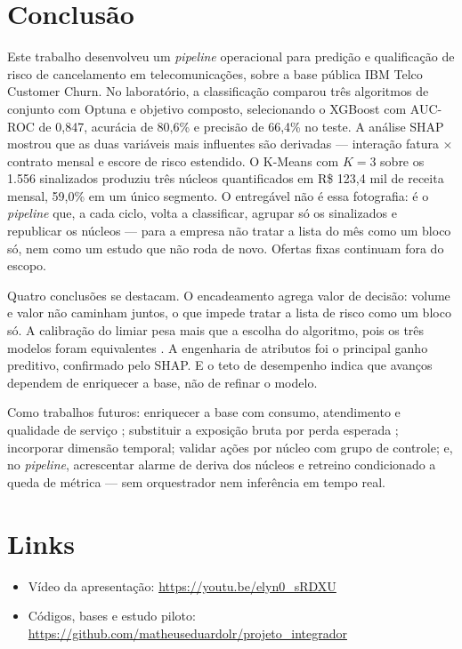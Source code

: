 \documentclass[12pt]{article}
\begin{document}
\section{Conclusão}
\label{sec:5}

Este trabalho desenvolveu um \textit{pipeline} operacional para predição e
qualificação de risco de cancelamento em telecomunicações, sobre a base pública
IBM Telco Customer Churn. No laboratório, a classificação comparou três
algoritmos de conjunto com Optuna e objetivo composto, selecionando o XGBoost
com AUC-ROC de 0,847, acurácia de 80,6\% e precisão de 66,4\% no teste. A
análise SHAP mostrou que as duas variáveis mais influentes são derivadas ---
interação fatura $\times$ contrato mensal e escore de risco estendido. O
K-Means com $K = 3$ sobre os 1.556 sinalizados produziu três núcleos
quantificados em R\$ 123,4 mil de receita mensal, 59,0\% em um único
segmento. O entregável não é essa fotografia: é o \textit{pipeline} que, a
cada ciclo, volta a classificar, agrupar só os sinalizados e republicar os
núcleos --- para a empresa não tratar a lista do mês como um bloco só, nem
como um estudo que não roda de novo. Ofertas fixas continuam fora do
escopo.

Quatro conclusões se destacam. O encadeamento agrega valor de decisão: volume
e valor não caminham juntos, o que impede tratar a lista de risco como um
bloco só. A calibração do limiar pesa mais que a escolha do algoritmo, pois
os três modelos foram equivalentes \cite{verbeke2012}. A engenharia de
atributos foi o principal ganho preditivo, confirmado pelo SHAP. E o teto
de desempenho indica que avanços dependem de enriquecer a base, não de
refinar o modelo.

Como trabalhos futuros: enriquecer a base com consumo, atendimento e
qualidade de serviço \cite{ahmad2019}; substituir a exposição bruta por
perda esperada \cite{verbeke2012}; incorporar dimensão temporal; validar
ações por núcleo com grupo de controle; e, no \textit{pipeline}, acrescentar
alarme de deriva dos núcleos e retreino condicionado a queda de métrica ---
sem orquestrador nem inferência em tempo real.

\section{Links}

\begin{itemize}
    \item Vídeo da apresentação: 
          \url{https://youtu.be/elyn0_sRDXU}

    \item Códigos, bases e estudo piloto:
          \url{https://github.com/matheuseduardolr/projeto_integrador}

\end{itemize}



\end{document}
